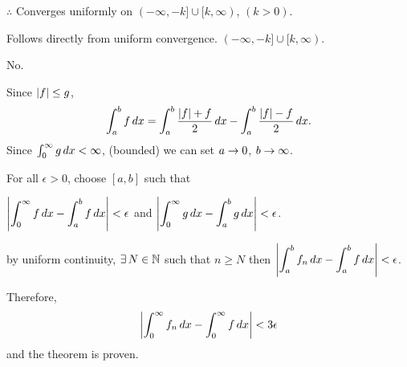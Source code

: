 \(\therefore\) Converges uniformly on \((-\infty, -k] \cup [k, \infty)\), \((k > 0)\).

 Follows directly from uniform convergence. \((-\infty, -k] \cup [k, \infty)\).

 No.

 Since \(\left| f \right| \leq g\),
\[
    \int_a^b f\,d{x} = \int_a^b \frac{\left| f \right| + f}{2} \,d{x} - \int_a^b \frac{\left| f \right| - f}{2} \,d{x}.
\]
Since \(\int_0^\infty g\,d{x} < \infty\), (bounded) we can set \(a \rightarrow 0\), \(b \rightarrow \infty\).

For all \(\epsilon > 0\), choose \([a, b]\) such that
\begin{center}
    \(\displaystyle \left| \int_0^\infty f\,d{x} - \int_a^b f\,d{x} \right| < \epsilon\) and \(\displaystyle \left| \int_0^\infty g\,d{x} - \int_a^b g\,d{x} \right| < \epsilon\).
\end{center}
by uniform continuity, \(\exists N \in \N\) such that \(n \geq N\) then \(\displaystyle \left| \int_a^b f_n\,d{x} - \int_a^b f\,d{x} \right| < \epsilon\).

Therefore,
\[
    \left| \int_0^\infty f_n \,d{x} - \int_0^\infty f \,d{x} \right| < 3\epsilon
\]
and the theorem is proven.






\pagebreak
